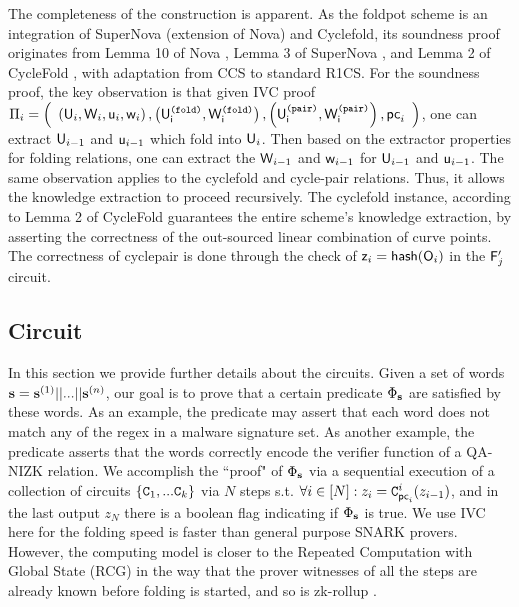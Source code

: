 The completeness of the construction is apparent. As the foldpot scheme
is an integration of SuperNova (extension of Nova) and Cyclefold,
its soundness proof originates from Lemma 10 of Nova \cite{Nova}, 
Lemma 3 of SuperNova \cite{SuperNova}, and Lemma 
2 of CycleFold \cite{CycleFold}, with adaptation from CCS to standard
R1CS. For the soundness proof, the key observation is that given IVC proof  
${\Pi}_{i} = \left(
	\begin{array}{l}
		\left(\mathsf{U}_{i}, \mathsf{W}_{i}, \mathsf{u}_{i}, \mathsf{w}_{i}\right), 
		\left(\mathsf{U^{\texttt{(fold)}}_{i}}, \mathsf{W^{\texttt{(fold)}}_{i}}\right), 
		\left(\mathsf{U^{\texttt{(pair)}}_{i}}, \mathsf{W^{\texttt{(pair)}}_{i}}\right),
		\mathsf{pc}_{i} 
	\end{array}
\right)$, one can extract $\mathsf{U}_{i-1}$ and $\mathsf{u}_{i-1}$ which
fold into $\mathsf{U}_{i}$. Then based on the extractor properties for
folding relations, one can extract the $\mathsf{W}_{i-1}$ and 
$\mathsf{w}_{i-1}$ for $\mathsf{U}_{i-1}$ and $\mathsf{u}_{i-1}$. The same observation
applies to the cyclefold and cycle-pair relations. Thus,
it allows the knowledge extraction to proceed recursively.
The cyclefold instance, according to Lemma 2 of CycleFold \cite{CycleFold}
guarantees the entire scheme's knowledge extraction, by asserting
the correctness of the out-sourced linear combination of curve points.
The correctness of cyclepair is done through the check of
$\mathsf{z}_i = \mathsf{hash}(\mathsf{O}_i)$ in the $\mathsf{F}_{j}'$ circuit.

\subsection{Circuit}
In this section we provide further details about the circuits.
Given a set of words ${{\mathbf {s}}} = {{\mathbf {s}}}^{(1)} || ... || {{\mathbf {s}}}^{(n)}$, our goal is to prove that a certain predicate $\Phi_{{{\mathbf {s}}}}$ 
are satisfied by these words.  As an example, the predicate may assert that
each word does not match any of the regex in a malware signature set.
As another example, the predicate asserts that
the words correctly encode the verifier function of a QA-NIZK relation.
We accomplish the ``proof" of $\Phi_{{{\mathbf {s}}}}$ via
a sequential execution of a collection of circuits
$\{{\texttt{C}}_1, ... {\texttt{C}}_k\}$ via $N$ steps s.t.
$\forall i\in [N]: z_i = {\texttt{C}}^i_{\mathsf{pc}_i}(z_{i-1})$,
and in the last output $z_N$ there is a boolean flag
indicating if $\Phi_{{{\mathbf {s}}}}$ is true. We use IVC here for
the folding speed is faster than general purpose SNARK provers.
However, the computing model is closer to the Repeated Computation
with Global State (RCG) \cite{RCG} in the way that 
the prover witnesses of all the steps are already known before folding 
is started, and so is zk-rollup \cite{Rollup}.

